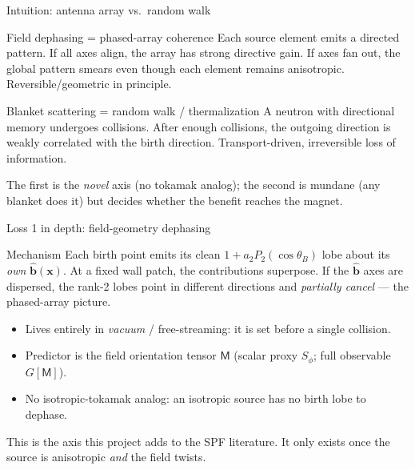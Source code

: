 \documentclass[aspectratio=169]{beamer}
\newcommand{\bb}{\hat{\bm b}}
\newcommand{\bx}{\bm x}
\newcommand{\M}{\mathsf M}
\newcommand{\Sphi}{S_\phi}
\begin{document}
\begin{frame}[t]{Intuition: antenna array vs.\ random walk}
\begin{block}{Field dephasing = phased-array coherence}
Each source element emits a directed pattern. If all axes align, the array has strong directive gain. If axes fan out, the global pattern smears even though each element remains anisotropic. Reversible/geometric in principle.
\end{block}
\begin{block}{Blanket scattering = random walk / thermalization}
A neutron with directional memory undergoes collisions. After enough collisions, the outgoing direction is weakly correlated with the birth direction. Transport-driven, irreversible loss of information.
\end{block}
The first is the \emph{novel} axis (no tokamak analog); the second is mundane (any blanket does it) but decides whether the benefit reaches the magnet.
\end{frame}

\begin{frame}[t]{Loss 1 in depth: field-geometry dephasing}
\begin{block}{Mechanism}
Each birth point emits its clean $1+a_2P_2(\cos\theta_B)$ lobe about its \emph{own} $\bb(\bx)$. At a fixed wall patch, the contributions superpose. If the $\bb$ axes are dispersed, the rank-2 lobes point in different directions and \emph{partially cancel} --- the phased-array picture.
\end{block}
\begin{itemize}
  \item Lives entirely in \emph{vacuum} / free-streaming: it is set before a single collision.
  \item Predictor is the field orientation tensor $\M$ (scalar proxy $\Sphi$; full observable $G[\M]$).
  \item \alert{No isotropic-tokamak analog:} an isotropic source has no birth lobe to dephase.
\end{itemize}
This is the axis this project adds to the SPF literature. It only exists once the source is anisotropic \emph{and} the field twists.
\end{frame}
\end{document}
